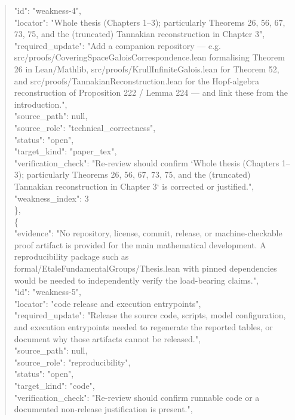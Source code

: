 \documentclass[11pt]{article}
\begin{document}
\begin{quote}
      "id": "weakness-4",\\
      "locator": "Whole thesis (Chapters 1--3); particularly Theorems 26, 56, 67, 73, 75, and the (truncated) Tannakian reconstruction in Chapter 3",\\
      "required\_update": "Add a companion repository --- e.g. src/proofs/CoveringSpaceGaloisCorrespondence.lean formalising Theorem 26 in Lean/Mathlib, src/proofs/KrullInfiniteGalois.lean for Theorem 52, and src/proofs/TannakianReconstruction.lean for the Hopf-algebra reconstruction of Proposition 222 / Lemma 224 --- and link these from the introduction.",\\
      "source\_path": null,\\
      "source\_role": "technical\_correctness",\\
      "status": "open",\\
      "target\_kind": "paper\_tex",\\
      "verification\_check": "Re-review should confirm `Whole thesis (Chapters 1--3); particularly Theorems 26, 56, 67, 73, 75, and the (truncated) Tannakian reconstruction in Chapter 3` is corrected or justified.",\\
      "weakness\_index": 3\\
    \},\\
    \{\\
      "evidence": "No repository, license, commit, release, or machine-checkable proof artifact is provided for the main mathematical development. A reproducibility package such as formal/EtaleFundamentalGroups/Thesis.lean with pinned dependencies would be needed to independently verify the load-bearing claims.",\\
      "id": "weakness-5",\\
      "locator": "code release and execution entrypoints",\\
      "required\_update": "Release the source code, scripts, model configuration, and execution entrypoints needed to regenerate the reported tables, or document why those artifacts cannot be released.",\\
      "source\_path": null,\\
      "source\_role": "reproducibility",\\
      "status": "open",\\
      "target\_kind": "code",\\
      "verification\_check": "Re-review should confirm runnable code or a documented non-release justification is present.",\\

\end{quote}
\end{document}
